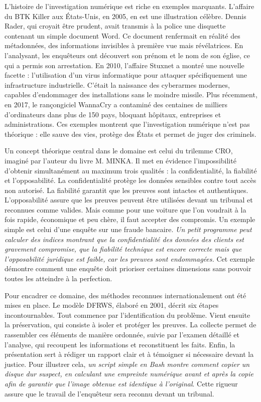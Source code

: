 \documentclass[12pt,a4paper]{article}
\begin{document}
	\vspace{0.5cm}
	
	\medskip
	\noindent
	L’histoire de l’investigation numérique est riche en exemples marquants. L’affaire du BTK Killer aux États-Unis, en 2005, en est une illustration célèbre. Dennis Rader, qui croyait être prudent, avait transmis à la police une disquette contenant un simple document Word. Ce document renfermait en réalité des métadonnées, des informations invisibles à première vue mais révélatrices. En l’analysant, les enquêteurs ont découvert son prénom et le nom de son église, ce qui a permis son arrestation. En 2010, l’affaire Stuxnet a montré une nouvelle facette : l’utilisation d’un virus informatique pour attaquer spécifiquement une infrastructure industrielle. C’était la naissance des cyberarmes modernes, capables d’endommager des installations sans le moindre missile. Plus récemment, en 2017, le rançongiciel WannaCry a contaminé des centaines de milliers d’ordinateurs dans plus de 150 pays, bloquant hôpitaux, entreprises et administrations. Ces exemples montrent que l’investigation numérique n’est pas théorique : elle sauve des vies, protège des États et permet de juger des criminels.
	
	\medskip
	\noindent
	Un concept théorique central dans le domaine est celui du trilemme CRO, imaginé par l'auteur du livre M. MINKA. Il met en évidence l’impossibilité d’obtenir simultanément au maximum trois qualités : la confidentialité, la fiabilité et l’opposabilité. La confidentialité protège les données sensibles contre tout accès non autorisé. La fiabilité garantit que les preuves sont intactes et authentiques. L’opposabilité assure que les preuves peuvent être utilisées devant un tribunal et reconnues comme valides. Mais comme pour une voiture que l’on voudrait à la fois rapide, économique et peu chère, il faut accepter des compromis. Un exemple simple est celui d’une enquête sur une fraude bancaire. \textit{Un petit programme peut calculer des indices montrant que la confidentialité des données des clients est gravement compromise, que la fiabilité technique est encore correcte mais que l’opposabilité juridique est faible, car les preuves sont endommagées.} Cet exemple démontre comment une enquête doit prioriser certaines dimensions sans pouvoir toutes les atteindre à la perfection.
	
	\medskip
	\noindent
	Pour encadrer ce domaine, des méthodes reconnues internationalement ont été mises en place. Le modèle DFRWS, élaboré en 2001, décrit six étapes incontournables. Tout commence par l’identification du problème. Vient ensuite la préservation, qui consiste à isoler et protéger les preuves. La collecte permet de rassembler ces éléments de manière ordonnée, suivie par l’examen détaillé et l’analyse, qui recoupent les informations et reconstituent les faits. Enfin, la présentation sert à rédiger un rapport clair et à témoigner si nécessaire devant la justice. Pour illustrer cela, \textit{un script simple en Bash montre comment copier un disque dur suspect, en calculant une empreinte numérique avant et après la copie afin de garantir que l’image obtenue est identique à l’original}. Cette rigueur assure que le travail de l’enquêteur sera reconnu devant un tribunal.
	
\end{document}
